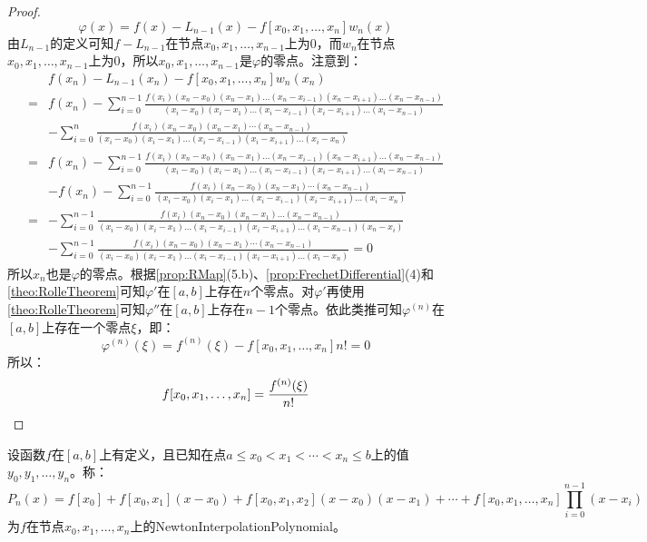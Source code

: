 \begin{proof}
	\begin{equation*}
		\varphi(x)=f(x)-L_{n-1}(x)-f[x_0,x_1,\dots,x_n]w_n(x)
	\end{equation*}
	由$L_{n-1}$的定义可知$f-L_{n-1}$在节点$x_0,x_1,\dots,x_{n-1}$上为$0$，而$w_n$在节点$x_0,x_1,\dots,x_{n-1}$上为$0$，所以$x_0,x_1,\dots,x_{n-1}$是$\varphi$的零点。注意到：
	\begin{align*}
		&f(x_n)-L_{n-1}(x_n)-f[x_0,x_1,\dots,x_n]w_n(x_n) \\
		=&f(x_n)-\sum_{i=0}^{n-1}\frac{f(x_i)(x_n-x_0)(x_n-x_1)\dots(x_n-x_{i-1})(x_n-x_{i+1})\dots(x_n-x_{n-1})}{(x_i-x_0)(x_i-x_1)\dots(x_i-x_{i-1})(x_i-x_{i+1})\dots(x_i-x_{n-1})} \\
		&-\sum_{i=0}^{n}\frac{f(x_i)(x_n-x_0)(x_n-x_1)\cdots(x_n-x_{n-1})}{(x_i-x_0)(x_i-x_1)\dots(x_i-x_{i-1})(x_i-x_{i+1})\dots(x_i-x_n)} \\
		=&f(x_n)-\sum_{i=0}^{n-1}\frac{f(x_i)(x_n-x_0)(x_n-x_1)\dots(x_n-x_{i-1})(x_n-x_{i+1})\dots(x_n-x_{n-1})}{(x_i-x_0)(x_i-x_1)\dots(x_i-x_{i-1})(x_i-x_{i+1})\dots(x_i-x_{n-1})} \\
		&-f(x_n)-\sum_{i=0}^{n-1}\frac{f(x_i)(x_n-x_0)(x_n-x_1)\cdots(x_n-x_{n-1})}{(x_i-x_0)(x_i-x_1)\dots(x_i-x_{i-1})(x_i-x_{i+1})\dots(x_i-x_n)} \\
		=&-\sum_{i=0}^{n-1}\frac{f(x_i)(x_n-x_0)(x_n-x_1)\dots(x_n-x_{n-1})}{(x_i-x_0)(x_i-x_1)\dots(x_i-x_{i-1})(x_i-x_{i+1})\dots(x_i-x_{n-1})(x_n-x_i)} \\
		&-\sum_{i=0}^{n-1}\frac{f(x_i)(x_n-x_0)(x_n-x_1)\cdots(x_n-x_{n-1})}{(x_i-x_0)(x_i-x_1)\dots(x_i-x_{i-1})(x_i-x_{i+1})\dots(x_i-x_n)}=0
	\end{align*}
	所以$x_n$也是$\varphi$的零点。根据\cref{prop:RMap}(5.b)、\cref{prop:FrechetDifferential}(4)和\cref{theo:RolleTheorem}可知$\varphi'$在$[a,b]$上存在$n$个零点。对$\varphi'$再使用\cref{theo:RolleTheorem}可知$\varphi''$在$[a,b]$上存在$n-1$个零点。依此类推可知$\varphi^{(n)}$在$[a,b]$上存在一个零点$\xi$，即：
	\begin{equation*}
		\varphi^{(n)}(\xi)=f^{(n)}(\xi)-f[x_0,x_1,\dots,x_n]n!=0
	\end{equation*}
	所以：
	\begin{equation*}
		f[x_0,x_1,\dots,x_n]=\frac{f^{(n)}(\xi)}{n!}\qedhere
	\end{equation*}
\end{proof}
\begin{definition}
	设函数$f$在$[a,b]$上有定义，且已知在点$a\leqslant x_0<x_1<\cdots<x_n\leqslant b$上的值$y_0,y_1,\dots,y_n$。称：
	\begin{equation*}
		P_n(x)=f[x_0]+f[x_0,x_1](x-x_0)+f[x_0,x_1,x_2](x-x_0)(x-x_1)+\cdots+f[x_0,x_1,\dots,x_n]\prod_{i=0}^{n-1}(x-x_i)
	\end{equation*}
	为$f$在节点$x_0,x_1,\dots,x_n$上的\gls{NewtonInterpolationPolynomial}。
\end{definition}
